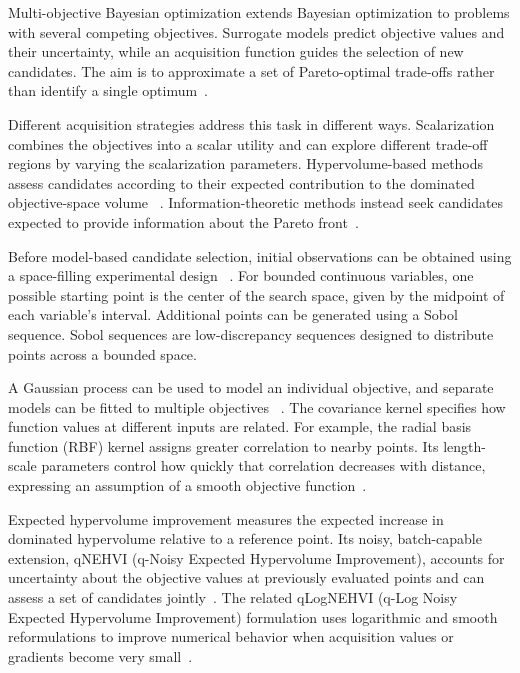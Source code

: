 Multi-objective Bayesian optimization extends Bayesian optimization
to problems with several competing objectives. Surrogate models
predict objective values and their uncertainty, while an acquisition
function guides the selection of new candidates. The aim is to
approximate a set of Pareto-optimal trade-offs rather than identify a
single optimum~\cite{Daulton2021qNEHVI}.

Different acquisition strategies address this task in different ways.
Scalarization combines the objectives into a scalar utility and can
explore different trade-off regions by varying the scalarization
parameters. Hypervolume-based methods assess candidates according to
their expected contribution to the dominated objective-space volume
~\cite{Daulton2021qNEHVI}. Information-theoretic methods instead seek
candidates expected to provide information about the Pareto
front~\cite{Tu2022Joint}.

Before model-based candidate selection, initial observations can be
obtained using a space-filling experimental design
~\cite{Frazier2018A}. For bounded continuous variables, one possible
starting point is the center of the search space, given by the midpoint
of each variable's interval. Additional points can be generated using
a Sobol sequence. Sobol sequences are low-discrepancy sequences
designed to distribute points across a bounded space.~\cite{Sobol1967}

A Gaussian process can be used to model an individual objective, and
separate models can be fitted to multiple objectives
~\cite{Daulton2021qNEHVI}. The covariance kernel specifies how
function values at different inputs are related. For example, the
radial basis function (RBF) kernel assigns greater correlation to
nearby points. Its length-scale parameters control how quickly that
correlation decreases with distance, expressing an assumption of a
smooth objective function~\cite{Frazier2018A}.

Expected hypervolume improvement measures the expected increase in
dominated hypervolume relative to a reference point. Its noisy,
batch-capable extension, qNEHVI (q-Noisy Expected Hypervolume Improvement), accounts for uncertainty about the
objective values at previously evaluated points and can assess a set
of candidates jointly~\cite{Daulton2021qNEHVI}. The related
qLogNEHVI (q-Log Noisy Expected Hypervolume Improvement) formulation uses logarithmic and smooth reformulations to
improve numerical behavior when acquisition values or gradients
become very small~\cite{Ament2023Unexpected}.

